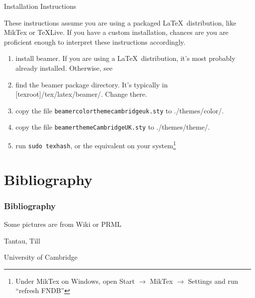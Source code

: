 \documentclass{beamer}
\begin{document}
\begin{frame}{Installation Instructions}

These instructions assume you are using a packaged \LaTeX~distribution, like MikTex or TeXLive. If you have a custom installation, chances are you are proficient enough to interpret these instructions accordingly.

\begin{enumerate}
  \item install beamer. If you are using a \LaTeX~distribution, it's most probably already installed. Otherwise, see \cite{Beamer}
	\item find the beamer package directory. It's typically in [texroot]/tex/latex/beamer/. Change there.
	\item copy the file {\tt beamercolorthemecambridgeuk.sty} to ./themes/color/.
	\item copy the file {\tt beamerthemeCambridgeUK.sty} to ./themes/theme/.
	\item run {\tt sudo texhash}, or the equivalent on your system\footnote{Under MikTex on Windows, open Start $\to$ MikTex $\to$ Settings and run ``refresh FNDB''}
	
\end{enumerate}

\end{frame}

\section*{Bibliography}
\begin{frame}%
\frametitle{Bibliography}

\begin{thebibliography}{Tantau, 2007}
Some pictures are from Wiki or PRML


Tantau, Till

University of Cambridge

\end{thebibliography}
\end{frame}
\end{document}
